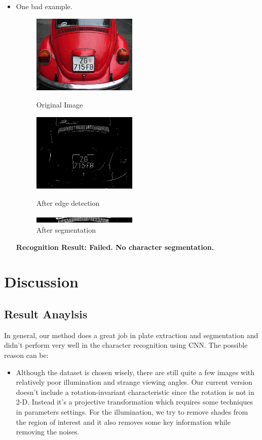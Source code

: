 \documentclass{article}
\begin{document}
\begin{spacing}{1.0}
\begin{itemize}
	\item One bad example.
	\begin{figure}[H]
		\centering
		\begin{minipage}{5cm}
			\includegraphics[width=5cm]{P1010013.jpg}
			\caption{Original Image}
		\end{minipage} 
		\begin{minipage}{5cm}
			\includegraphics[width=5cm]{P1010013_edge.jpg}
			\caption{After edge detection}
		\end{minipage}
		\begin{minipage}{5cm}
			\includegraphics[width=5cm]{P1010013_extract.jpg}
			\caption{After segmentation}
		\end{minipage}
	\end{figure}
	\textbf{Recognition Result: Failed. No character segmentation.}
\end{itemize}


\section{Discussion}
\subsection{Result Anaylsis}
In general, our method does a great job in plate extraction and segmentation and didn't perform very well in the character recognition using CNN. The possible reason can be:
\begin{itemize}
	\item Although the dataset is chosen wisely, there are still quite a few images with relatively poor illumination and strange viewing angles. Our current version doesn't include a rotation-invariant characteristic since the rotation is not in 2-D. Instead it's a projective transformation which requires some techniques in parameters settings. For the illumination, we try to remove shades from the region of interest and it also removes some key information while removing the noises.
	

\end{itemize}
\end{spacing}
\end{document}
